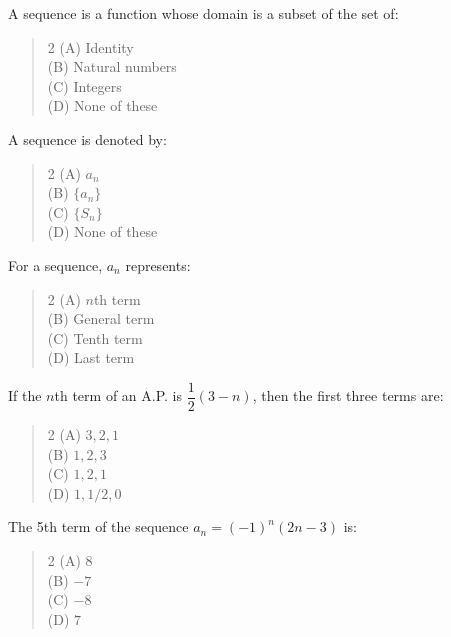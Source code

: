 \documentclass[11pt,a4paper]{article}
\begin{document}
\begin{mcqlist}
\item A sequence is a function whose domain is a subset of the set of:
\begin{quote}\begin{multicols}{2}
\noindent (A) Identity \\
(B) Natural numbers \\
(C) Integers \\
(D) None of these
\end{multicols}\end{quote}

\item A sequence is denoted by:
\begin{quote}\begin{multicols}{2}
\noindent (A) $a_n$ \\
(B) $\{a_n\}$ \\
(C) $\{S_n\}$ \\
(D) None of these
\end{multicols}\end{quote}

\item For a sequence, $a_n$ represents:
\begin{quote}\begin{multicols}{2}
\noindent (A) $n$th term \\
(B) General term \\
(C) Tenth term \\
(D) Last term
\end{multicols}\end{quote}

\item If the $n$th term of an A.P. is $\dfrac{1}{2}(3-n)$, then the first three terms are:
\begin{quote}\begin{multicols}{2}
\noindent (A) $3,2,1$ \\
(B) $1,2,3$ \\
(C) $1,2,1$ \\
(D) $1,1/2,0$
\end{multicols}\end{quote}

\item The 5th term of the sequence $a_n=(-1)^n(2n-3)$ is:
\begin{quote}\begin{multicols}{2}
\noindent (A) $8$ \\
(B) $-7$ \\
(C) $-8$ \\
(D) $7$
\end{multicols}\end{quote}


\end{mcqlist}
\end{document}
